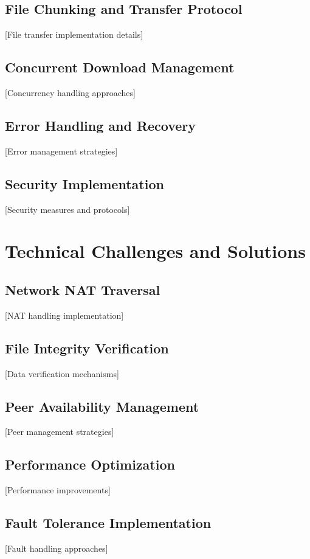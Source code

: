\section{File Chunking and Transfer Protocol}
 [File transfer implementation details]

\section{Concurrent Download Management}
 [Concurrency handling approaches]

\section{Error Handling and Recovery}
 [Error management strategies]

\section{Security Implementation}
 [Security measures and protocols]

\chapter{Technical Challenges and Solutions}
\section{Network NAT Traversal}
 [NAT handling implementation]

\section{File Integrity Verification}
 [Data verification mechanisms]

\section{Peer Availability Management}
 [Peer management strategies]

\section{Performance Optimization}
 [Performance improvements]

\section{Fault Tolerance Implementation}
 [Fault handling approaches]

